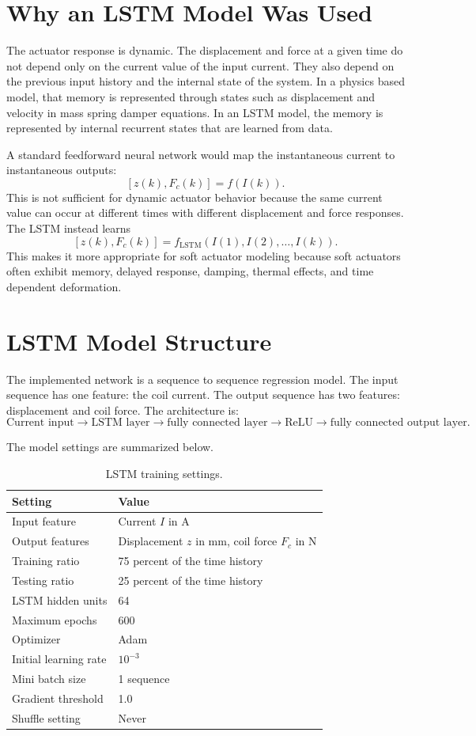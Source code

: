 \documentclass[11pt]{article}
\begin{document}
\section{Why an LSTM Model Was Used}

The actuator response is dynamic. The displacement and force at a given time do not depend only on the current value of the input current. They also depend on the previous input history and the internal state of the system. In a physics based model, that memory is represented through states such as displacement and velocity in mass spring damper equations. In an LSTM model, the memory is represented by internal recurrent states that are learned from data.

A standard feedforward neural network would map the instantaneous current to instantaneous outputs:
\[
    [z(k), F_c(k)] = f(I(k)).
\]
This is not sufficient for dynamic actuator behavior because the same current value can occur at different times with different displacement and force responses. The LSTM instead learns
\[
    [z(k), F_c(k)] = f_{\mathrm{LSTM}}\left(I(1), I(2), \ldots, I(k)\right).
\]
This makes it more appropriate for soft actuator modeling because soft actuators often exhibit memory, delayed response, damping, thermal effects, and time dependent deformation.

\section{LSTM Model Structure}

The implemented network is a sequence to sequence regression model. The input sequence has one feature: the coil current. The output sequence has two features: displacement and coil force. The architecture is:
\[
\text{Current input} \rightarrow \text{LSTM layer} \rightarrow \text{fully connected layer} \rightarrow \text{ReLU} \rightarrow \text{fully connected output layer}.
\]

The model settings are summarized below.

\begin{table}[H]
\centering
\caption{LSTM training settings.}
\begin{tabular}{ll}
\toprule
Setting & Value \\
\midrule
Input feature & Current \(I\) in A \\
Output features & Displacement \(z\) in mm, coil force \(F_c\) in N \\
Training ratio & 75 percent of the time history \\
Testing ratio & 25 percent of the time history \\
LSTM hidden units & 64 \\
Maximum epochs & 600 \\
Optimizer & Adam \\
Initial learning rate & \(10^{-3}\) \\
Mini batch size & 1 sequence \\
Gradient threshold & 1.0 \\
Shuffle setting & Never \\
\bottomrule
\end{tabular}
\end{table}
\end{document}
